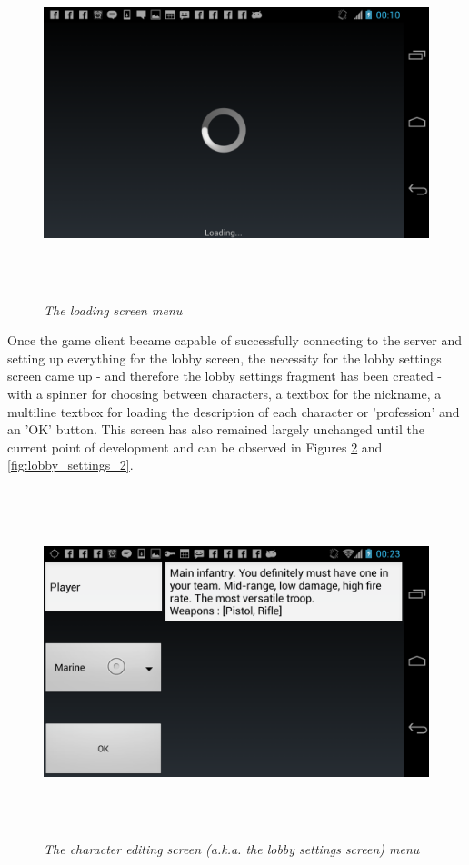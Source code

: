 \documentclass{article}
\begin{document}
\begin{figure}
\includegraphics[height=4in,width=7.12in]{./images/android_screenshots/tutorial_loading.png}
\caption{\small \sl The loading screen
menu\label{fig:loading}}
\end{figure}

Once the game client became capable of successfully connecting to the server and
setting up everything for the lobby screen, the necessity for the lobby settings
screen came up - and therefore the lobby settings fragment has been created -
with a spinner for choosing between characters, a textbox for the nickname, a
multiline textbox for loading the description of each character or 'profession'
and an 'OK' button. This screen has also remained largely unchanged until the
current point of development and can be observed in Figures
\ref{fig:lobby_settings_1} and \ref{fig:lobby_settings_2}.

\begin{figure}
\includegraphics[height=4in,width=7.12in]{./images/android_screenshots/first_development/game_first_development9.png}
\caption{\small \sl The character editing screen (a.k.a. the lobby settings
screen) menu\label{fig:lobby_settings_1}}
\end{figure}
\end{document}
